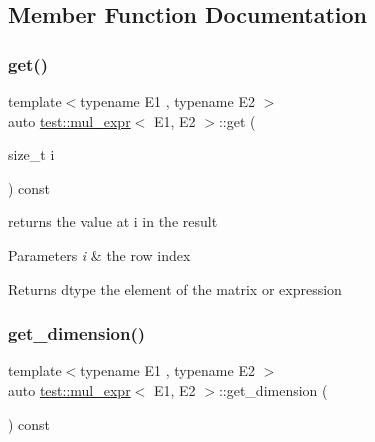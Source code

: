 \subsection{Member Function Documentation}
\mbox{\label{classtest_1_1mul__expr_a7a1db865b69e8e73af85254fb7a932cf}} 
\subsubsection{\texorpdfstring{get()}{get()}}
{\footnotesize\ttfamily template$<$typename E1 , typename E2 $>$ \\
auto \mbox{\hyperlink{classtest_1_1mul__expr}{test\+::mul\+\_\+expr}}$<$ E1, E2 $>$\+::get (\begin{DoxyParamCaption}\item[{size\+\_\+t}]{i }\end{DoxyParamCaption}) const\hspace{0.3cm}{\ttfamily [inline]}}



returns the value at i in the result 


\begin{DoxyParams}{Parameters}
{\em i} & the row index \\
\hline
\end{DoxyParams}
\begin{DoxyReturn}{Returns}
dtype the element of the matrix or expression 
\end{DoxyReturn}
\mbox{\label{classtest_1_1mul__expr_ad49468b3924a80f558747daf702505ae}} 
\subsubsection{\texorpdfstring{get\_dimension()}{get\_dimension()}}
{\footnotesize\ttfamily template$<$typename E1 , typename E2 $>$ \\
auto \mbox{\hyperlink{classtest_1_1mul__expr}{test\+::mul\+\_\+expr}}$<$ E1, E2 $>$\+::get\+\_\+dimension (\begin{DoxyParamCaption}{ }\end{DoxyParamCaption}) const\hspace{0.3cm}{\ttfamily [inline]}}



